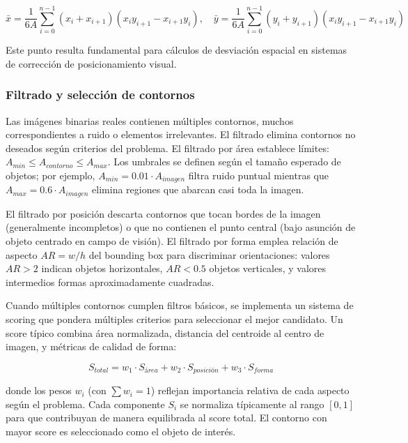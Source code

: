 \begin{equation}
\bar{x} = \frac{1}{6A}\sum_{i=0}^{n-1}(x_i + x_{i+1})(x_i y_{i+1} - x_{i+1}y_i), \quad \bar{y} = \frac{1}{6A}\sum_{i=0}^{n-1}(y_i + y_{i+1})(x_i y_{i+1} - x_{i+1}y_i)
\end{equation}

Este punto resulta fundamental para cálculos de desviación espacial en sistemas de corrección de posicionamiento visual.

\subsubsection{Filtrado y selección de contornos}

Las imágenes binarias reales contienen múltiples contornos, muchos correspondientes a ruido o elementos irrelevantes. El filtrado elimina contornos no deseados según criterios del problema. El filtrado por área establece límites: $A_{min} \leq A_{contorno} \leq A_{max}$. Los umbrales se definen según el tamaño esperado de objetos; por ejemplo, $A_{min} = 0.01 \cdot A_{imagen}$ filtra ruido puntual mientras que $A_{max} = 0.6 \cdot A_{imagen}$ elimina regiones que abarcan casi toda la imagen.

El filtrado por posición descarta contornos que tocan bordes de la imagen (generalmente incompletos) o que no contienen el punto central (bajo asunción de objeto centrado en campo de visión). El filtrado por forma emplea relación de aspecto $AR = w/h$ del bounding box para discriminar orientaciones: valores $AR > 2$ indican objetos horizontales, $AR < 0.5$ objetos verticales, y valores intermedios formas aproximadamente cuadradas.

Cuando múltiples contornos cumplen filtros básicos, se implementa un sistema de scoring que pondera múltiples criterios para seleccionar el mejor candidato. Un score típico combina área normalizada, distancia del centroide al centro de imagen, y métricas de calidad de forma:

\begin{equation}
S_{total} = w_1 \cdot S_{área} + w_2 \cdot S_{posición} + w_3 \cdot S_{forma}
\end{equation}

donde los pesos $w_i$ (con $\sum w_i = 1$) reflejan importancia relativa de cada aspecto según el problema. Cada componente $S_i$ se normaliza típicamente al rango $[0,1]$ para que contribuyan de manera equilibrada al score total. El contorno con mayor score es seleccionado como el objeto de interés.

